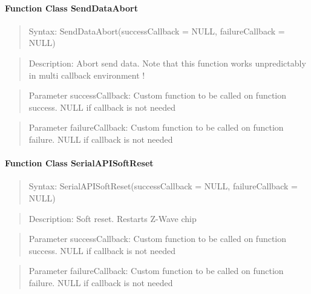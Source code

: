 \paragraph{Function Class SendDataAbort}
\begin{quote}Syntax: SendDataAbort(successCallback = NULL, failureCallback = NULL)\end{quote}
\begin{quote}Description: Abort send data. Note that this function works unpredictably in multi callback environment !\end{quote}
\begin{quote}Parameter successCallback: Custom function to be called on function success. NULL if callback is not needed\end{quote}
\begin{quote}Parameter failureCallback: Custom function to be called on function failure. NULL if callback is not needed\end{quote}


\paragraph{Function Class SerialAPISoftReset}
\begin{quote}Syntax: SerialAPISoftReset(successCallback = NULL, failureCallback = NULL)\end{quote}
\begin{quote}Description: Soft reset. Restarts Z-Wave chip\end{quote}
\begin{quote}Parameter successCallback: Custom function to be called on function success. NULL if callback is not needed\end{quote}
\begin{quote}Parameter failureCallback: Custom function to be called on function failure. NULL if callback is not needed\end{quote}


